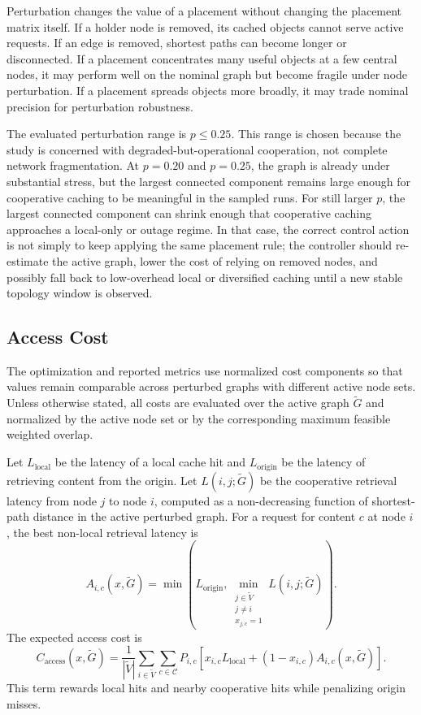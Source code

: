 Perturbation changes the value of a placement without changing the placement matrix itself. If a holder node is removed, its cached objects cannot serve active requests. If an edge is removed, shortest paths can become longer or disconnected. If a placement concentrates many useful objects at a few central nodes, it may perform well on the nominal graph but become fragile under node perturbation. If a placement spreads objects more broadly, it may trade nominal precision for perturbation robustness.

The evaluated perturbation range is \(p\leq 0.25\). This range is chosen because the study is concerned with degraded-but-operational cooperation, not complete network fragmentation. At \(p=0.20\) and \(p=0.25\), the graph is already under substantial stress, but the largest connected component remains large enough for cooperative caching to be meaningful in the sampled runs. For still larger \(p\), the largest connected component can shrink enough that cooperative caching approaches a local-only or outage regime. In that case, the correct control action is not simply to keep applying the same placement rule; the controller should re-estimate the active graph, lower the cost of relying on removed nodes, and possibly fall back to low-overhead local or diversified caching until a new stable topology window is observed.

\subsection{Access Cost}

The optimization and reported metrics use normalized cost components so that values remain comparable across perturbed graphs with different active node sets. Unless otherwise stated, all costs are evaluated over the active graph \(\tilde{G}\) and normalized by the active node set or by the corresponding maximum feasible weighted overlap.

Let \(L_{\text{local}}\) be the latency of a local cache hit and \(L_{\text{origin}}\) be the latency of retrieving content from the origin. Let \(L(i,j;\tilde{G})\) be the cooperative retrieval latency from node \(j\) to node \(i\), computed as a non-decreasing function of shortest-path distance in the active perturbed graph. For a request for content \(c\) at node \(i\), the best non-local retrieval latency is
\[
A_{i,c}(x,\tilde{G})
=
\min\left(
L_{\text{origin}},
\min_{\substack{j \in \tilde{V}\\j \ne i\\x_{j,c}=1}} L(i,j;\tilde{G})
\right).
\]
The expected access cost is
\[
C_{\text{access}}(x,\tilde{G})
=
\frac{1}{|\tilde{V}|}
\sum_{i \in \tilde{V}}\sum_{c \in \mathcal{C}}
P_{i,c}
\left[
x_{i,c}L_{\text{local}}+
(1-x_{i,c})A_{i,c}(x,\tilde{G})
\right].
\]
This term rewards local hits and nearby cooperative hits while penalizing origin misses.

